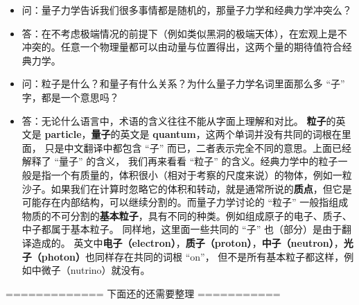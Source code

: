 \begin{itemize}
\item 问：量子力学告诉我们很多事情都是随机的，那量子力学和经典力学冲突么？
\item 答：在不考虑极端情况的前提下（例如类似黑洞的极端天体），在宏观上是不冲突的。任意一个物理量都可以由动量与位置得出，这两个量的期待值符合经典力学。
\item 问：粒子是什么？和量子有什么关系？为什么量子力学名词里面那么多 “子” 字，都是一个意思吗？
\item 答：无论什么语言中，术语的含义往往不能从字面上理解和对比。 \textbf{粒子}的英文是 \textbf{particle}，\textbf{量子}的英文是 \textbf{quantum}，这两个单词并没有共同的词根在里面， 只是中文翻译中都包含 “子” 而已，二者表示完全不同的意思。上面已经解释了 “量子” 的含义， 我们再来看看 “粒子” 的含义。经典力学中的粒子一般是指一个有质量的，体积很小（相对于考察的尺度来说）的物体，例如一粒沙子。如果我们在计算时忽略它的体积和转动，就是通常所说的\textbf{质点}，但它是可能存在内部结构，可以继续分割的。而量子力学讨论的 “粒子” 一般指组成物质的不可分割的\textbf{基本粒子}，具有不同的种类。例如组成原子的电子、质子、中子都属于基本粒子。 同样地，这里面一些共同的 “子” 也（部分）是由于翻译造成的。 英文中\textbf{电子（electron）}，\textbf{质子（proton）}，\textbf{中子（neutron）}，\textbf{光子（photon）}也同样存在共同的词根 “on”， 但不是所有基本粒子都这样，例如中微子（nutrino）就没有。
\end{itemize}


============= 下面还的还需要整理 ===========

